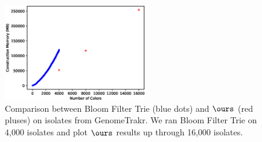 





\begin{figure}[h!]
  \includegraphics[width=0.55\textwidth]{content/BFTvsVARI.eps}
 \caption{Comparison between Bloom Filter Trie (blue dots) and $\ours$ (red pluses) on isolates from GenomeTrakr.  We ran Bloom Filter Trie on 4,000 isolates and plot $\ours$ results up through 16,000 isolates.}
 \label{figure:bftvsvari}
\end{figure}


